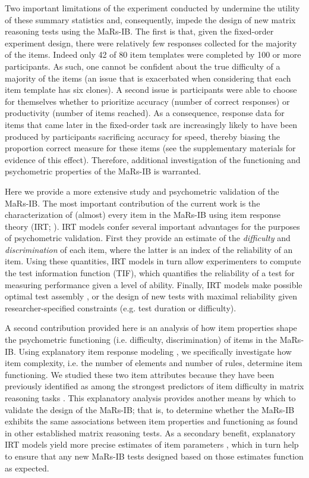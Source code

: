 \documentclass[a4paper,man,natbib]{apa6}
\begin{document}
Two important limitations of the experiment conducted by \cite{chierchia2019matrix} undermine the utility of these summary statistics and, consequently, impede the design of new matrix reasoning tests using the MaRs-IB. The first is that, given the fixed-order experiment design, there were relatively few responses collected for the majority of the items. Indeed only 42 of 80 item templates were completed by 100 or more participants. As such, one cannot be confident about the true difficulty of a majority of the items (an issue that is exacerbated when considering that each item template has six clones). A second issue is participants were able to choose for themselves whether to prioritize accuracy (number of correct responses) or productivity (number of items reached). As a consequence, response data for items that came later in the fixed-order task are increasingly likely to have been produced by participants sacrificing accuracy for speed, thereby biasing the proportion correct measure for these items (see the supplementary materials for evidence of this effect). Therefore, additional investigation of the functioning and psychometric properties of the MaRs-IB is warranted.

Here we provide a more extensive study and psychometric validation of the MaRs-IB. The most important contribution of the current work is the characterization of (almost) every item in the MaRs-IB using item response theory (IRT; \citealt{embretson2013item, de2013theory}). IRT models confer several important advantages for the purposes of psychometric validation. First they provide an estimate of the \textit{difficulty} and \textit{discrimination} of each item, where the latter is an index of the reliability of an item. Using these quantities, IRT models in turn allow experimenters to compute the test information function (TIF), which quantifies the reliability of a test for measuring performance given a level of ability. Finally, IRT models make possible optimal test assembly \citep{van1998optimal}, or the design of new tests with maximal reliability given researcher-specified constraints (e.g. test duration or difficulty).

A second contribution provided here is an analysis of how item properties shape the psychometric functioning (i.e. difficulty, discrimination) of items in the MaRs-IB. Using explanatory item response modeling \citep{de2004explanatory, wilson2008explanatory}, we specifically investigate how item complexity, i.e. the number of elements and number of rules, determine item functioning. We studied these two item attributes because they have been previously identified as among the strongest predictors of item difficulty in matrix reasoning tasks \citep{embretson1998cognitive, primi2001complexity}. This explanatory analysis provides another means by which to validate the design of the MaRs-IB; that is, to determine whether the MaRs-IB exhibits the same associations between item properties and functioning as found in other established matrix reasoning tests. As a secondary benefit, explanatory IRT models yield more precise estimates of item parameters \citep{neuhaus2006separating}, which in turn help to ensure that any new MaRs-IB tests designed based on those estimates function as expected.
\end{document}
